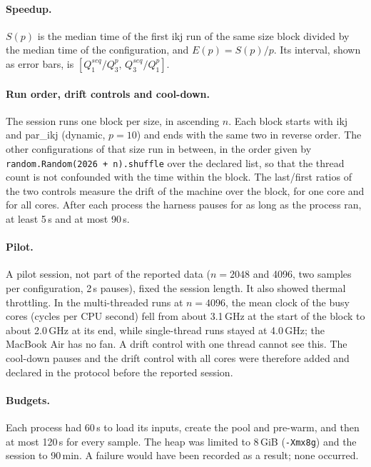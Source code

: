 \documentclass[11pt,a4paper]{article}
\begin{document}
\paragraph{Speedup.} $S(p)$ is the median time of the first ikj run of the same
size block divided by the median time of the configuration, and
$E(p)=S(p)/p$. Its interval, shown as error bars, is
$[Q_1^{seq}/Q_3^{p},\,Q_3^{seq}/Q_1^{p}]$.

\paragraph{Run order, drift controls and cool-down.} The session runs one block
per size, in ascending $n$. Each block starts with ikj and par\_ikj (dynamic,
$p=10$) and ends with the same two in reverse order. The other configurations
of that size run in between, in the order given by
\texttt{random.Random(2026\,+\,n).shuffle} over the declared list, so that the
thread count is not confounded with the time within the block. The last/first
ratios of the two controls measure the drift of the machine over the block, for
one core and for all cores. After each process the harness pauses for as long
as the process ran, at least 5\,s and at most 90\,s.

\paragraph{Pilot.} A pilot session, not part of the reported data ($n=2048$ and
4096, two samples per configuration, 2\,s pauses), fixed the session length. It
also showed thermal throttling. In the multi-threaded runs at $n=4096$, the mean
clock of the busy cores (cycles per CPU second) fell from about 3.1\,GHz at the
start of the block to about 2.0\,GHz at its end, while single-thread runs stayed
at 4.0\,GHz; the MacBook Air has no fan. A drift control with one thread cannot
see this. The cool-down pauses and the drift control with all cores were
therefore added and declared in the protocol before the reported session.

\paragraph{Budgets.} Each process had 60\,s to load its inputs, create the pool
and pre-warm, and then at most 120\,s for every sample. The heap was limited to
8\,GiB (\texttt{-Xmx8g}) and the session to 90\,min. A failure would have been
recorded as a result; none occurred.
\end{document}
